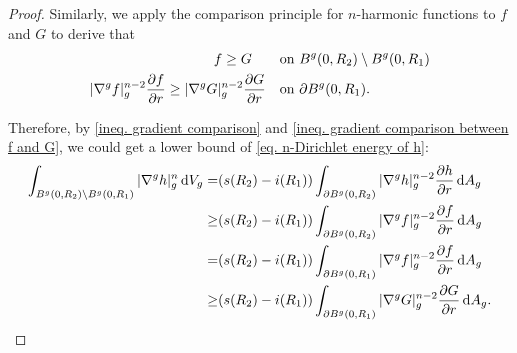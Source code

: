 \documentclass[10pt,a4paper]{amsart}
\numberwithin{equation}{section}
\newcommand{\dd}{\mathop{}\!\mathrm{d}}%
\newcommand{\nablag}{\nabla^g} %
\begin{document}
\begin{proof}
    Similarly, we apply the comparison principle for $n$-harmonic functions to $f$ and $G$ to derive that
    \begin{align}
        f\geq G \quad\quad\text{on }& B^g(0,R_2)\setminus B^g(0,R_1)\notag\\
        |\nablag f|_g^{n-2}\frac{\partial f}{\partial r}
        \geq  
        |\nablag G|_g^{n-2}\frac{\partial G}{\partial r} 
        \quad\text{on }& \partial B^g(0,R_1).\label{ineq. gradient comparison between f and G}
    \end{align}

    Therefore, by \cref{ineq. gradient comparison} and \cref{ineq. gradient comparison between f and G}, we could get a lower bound of \cref{eq. n-Dirichlet energy of h}:
    \begin{align}
        \int_{B^g(0,R_2)\setminus B^g(0,R_1)}|\nabla^g h|_g^n\dd V_g
        =&(s(R_2)-i(R_1))\int_{\partial B^g(0,R_2)} |\nablag h|_g^{n-2}\frac{\partial h}{\partial r}\dd A_g \notag\\
        \geq &(s(R_2)-i(R_1))\int_{\partial B^g(0,R_2)} |\nablag f|_g^{n-2}\frac{\partial f}{\partial r}\dd A_g\notag\\
        =&(s(R_2)-i(R_1))\int_{\partial B^g(0,R_1)} |\nablag f|_g^{n-2}\frac{\partial f}{\partial r}\dd A_g\notag\\
        \geq & (s(R_2)-i(R_1))\int_{\partial B^g(0,R_1)} |\nablag G|_g^{n-2}\frac{\partial G}{\partial r}
        \dd A_g.
        \label{ineq. lower bound of n-Dirichlet energy of h}
    \end{align}


\end{proof}
\end{document}

